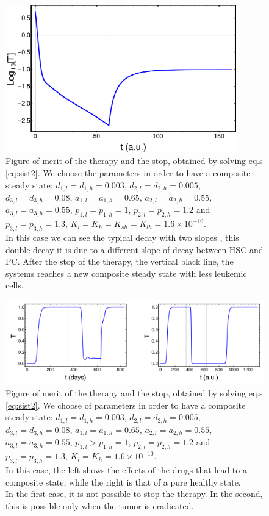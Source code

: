 \documentclass[a4paper,10pt]{article}
\begin{document}
\begin{figure}
\centering
\includegraphics[width=10cm ]{stop-composite.pdf}
\caption{Figure of merit  of the therapy and the stop, obtained by
solving eq.s \eqref{eq:sist2}.
We choose the parameters in order to have a 
composite steady state: 
$d_{1,l}=d_{1,h}=0.003$, $d_{2,l}=d_{2,h}=0.005$,
$d_{3,l}=d_{3,h}=0.08$, $a_{1,l}=a_{1,h}=0.65$,  $a_{2,l}=a_{2,h}=0.55$,  
$a_{3,l}=a_{3,h}=0.55$, $p_{1,l}=p_{1,h}=1$, $p_{2,l}=p_{2,h}=1.2$ and
$p_{3,l}=p_{3,h}=1.3$, $K_{l}=K_{h}=K_{sh}=K_{lh}=1.6\times 10^{-10}$.\\
In this case we can see the typical decay with two slopes \cite{michor2005}, 
this double decay it is due to a different slope of decay between HSC and PC.
After the stop of the therapy, the vertical black line,
 the systems reaches a new composite steady state with less leukemic cells.}
\label{fig:stop-composite}
\end{figure}


\begin{figure}
\centering
\includegraphics[width=13cm] {stop-terapia-caso-regolated.pdf}
\caption{Figure of merit of the therapy and the stop, obtained by
solving eq.s \eqref{eq:sist2}. We choose of parameters in order to have a 
composite steady state: 
$d_{1,l}=d_{1,h}=0.003$, $d_{2,l}=d_{2,h}=0.005$,
$d_{3,l}=d_{3,h}=0.08$, $a_{1,l}=a_{1,h}=0.65$, $a_{2,l}=a_{2,h}=0.55$, 
$a_{3,l}=a_{3,h}=0.55$, $p_{1,l}>p_{1,h}=1$, $p_{2,l}=p_{2,h}=1.2$ and
$p_{3,l}=p_{3,h}=1.3$, $K_{l}=K_{h}=1.6\times 10^{-10}$.\\
In this case, the left shows the effects of the drugs that lead to a composite state, while
the right is that of a pure healthy state.\\
In the first case, it is not possible to stop the therapy. In the second,
this is possible only when the tumor is eradicated.}
\label{fig:stop-pure-l}
\end{figure}
\end{document}
